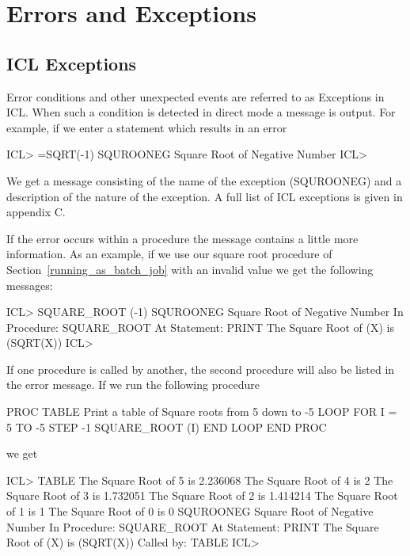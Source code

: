 \documentclass[twoside,11pt,nolof,chapters]{starlink}
\begin{document}
\chapter{Errors and Exceptions}

\section{ICL Exceptions}

Error conditions and other unexpected events are referred to as Exceptions
in ICL. When such a condition is detected in direct mode a message is
output. For example, if we enter a statement which results in an error
\begin{terminalv}
    ICL> =SQRT(-1)
    SQUROONEG   Square Root of Negative Number
    ICL>
\end{terminalv}

We get a message consisting of the name of the exception (SQUROONEG) and
a description of the nature of the exception. A full list of ICL
exceptions is given in appendix C.

If the error occurs within a procedure the message contains a little
more information. As an example, if we use our square root procedure of
Section~\ref{running_as_batch_job} with an invalid value we get the following messages:
\begin{terminalv}
    ICL> SQUARE_ROOT (-1)
    SQUROONEG   Square Root of Negative Number
    In Procedure: SQUARE_ROOT
    At Statement: PRINT  The Square Root of (X) is (SQRT(X))
    ICL>
\end{terminalv}

If one procedure is called by another, the second procedure will also
be listed in the error message. If we run the following procedure

\begin{terminalv}
    PROC TABLE
    {  Print a table of Square roots from 5 down to -5  }
       LOOP FOR I = 5 TO -5 STEP -1
         SQUARE_ROOT (I)
       END LOOP
    END PROC
\end{terminalv}

we get

\begin{terminalv}
    ICL> TABLE
    The Square Root of 5 is 2.236068
    The Square Root of 4 is 2
    The Square Root of 3 is 1.732051
    The Square Root of 2 is 1.414214
    The Square Root of 1 is 1
    The Square Root of 0 is 0
    SQUROONEG   Square Root of Negative Number
    In Procedure: SQUARE_ROOT
    At Statement: PRINT  The Square Root of (X) is (SQRT(X))
    Called by: TABLE
    ICL>
\end{terminalv}
\end{document}
